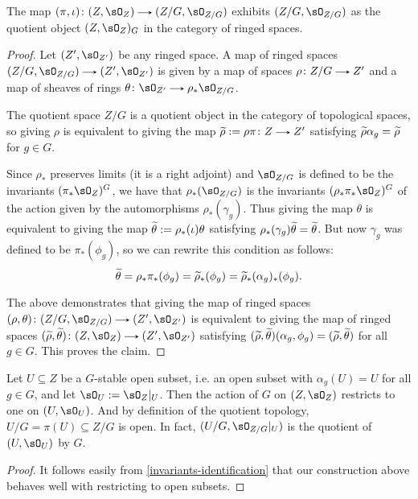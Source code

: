 \begin{nothing}
  \begin{subproposition}
    \label{ringed-space-quotient-univ}
    The map $(\pi,\iota) \c (Z,\sO_Z) \to (Z/G,\sO_{Z/G})$ exhibits $(Z/G,\sO_{Z/G})$ as the quotient object $(Z,\sO_Z)_G$ in the category of ringed spaces.

    \begin{proof}
      Let $(Z',\sO_{Z'})$ be any ringed space. A map of ringed spaces $(Z/G,\sO_{Z/G}) \to (Z',\sO_{Z'})$ is given by a map of spaces $\rho \c Z/G \to Z'$ and a map of sheaves of rings $\theta \c \sO_{Z'} \to \rho_*\sO_{Z/G}$.
      
      The quotient space $Z/G$ is a quotient object in the category of topological spaces, so giving $\rho$ is equivalent to giving the map $\til\rho \ce \rho\pi \c Z \to Z'$ satisfying $\widetilde\rho\alpha_g = \widetilde\rho$ for $g \in G$.

      Since $\rho_*$ preserves limits (it is a right adjoint) and $\sO_{Z/G}$ is defined to be the invariants $(\pi_*\sO_Z)^G$, we have that $\rho_*(\sO_{Z/G})$ is the invariants $(\rho_*\pi_*\sO_Z)^G$ of the action given by the automorphisms $\rho_*(\gamma_g)$. Thus giving the map $\theta$ is equivalent to giving the map $\widetilde\theta \mathrel{:=} \rho_*(\iota)\theta$ satisfying $\rho_*(\gamma_g)\widetilde\theta = \widetilde\theta$. But now $\gamma_g$ was defined to be $\pi_*(\phi_g)$, so we can rewrite this condition as follows:
      \[
        \widetilde\theta = \rho_*\pi_*(\phi_g) = \widetilde\rho_*(\phi_g) = \widetilde\rho_*(\alpha_g)_*(\phi_g).
      \]

      The above demonstrates that giving the map of ringed spaces $(\rho,\theta) \c (Z/G,\sO_{Z/G}) \to (Z',\sO_{Z'})$ is equivalent to giving the map of ringed spaces $(\til\rho,\til\theta) \c (Z,\sO_Z) \to (Z',\sO_{Z'})$ satisfying $(\widetilde\rho,\widetilde\theta)(\alpha_g,\phi_g) = (\widetilde\rho,\widetilde\theta)$ for all $g \in G$. This proves the claim.
    \end{proof}
  \end{subproposition}

  \begin{sublemma}
    \label{ringed-space-quotient-open}
    Let $U \subseteq Z$ be a $G$-stable open subset, i.e. an open subset with $\alpha_g(U) = U$ for all $g \in G$, and let $\sO_U \ce \sO_Z|_U$. Then the action of $G$ on $(Z,\sO_Z)$ restricts to one on $(U,\sO_U)$. And by definition of the quotient topology, $U/G = \pi(U) \subseteq Z/G$ is open. In fact, $(U/G, \sO_{Z/G}|_U)$ is the quotient of $(U,\sO_U)$ by $G$.

    \begin{proof}
      It follows easily from \cref{invariants-identification} that our construction above behaves well with restricting to open subsets.
    \end{proof}
  \end{sublemma}
\end{nothing}

